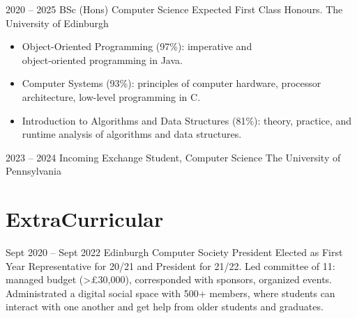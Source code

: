 \documentclass[
	9pt, %
]{FreemanCV}
\begin{document}
\begin{paracol}{2}
\qualificationentry
	{2020 -- 2025} %
	{BSc (Hons) Computer Science} %
	{Expected First Class Honours.} %
	{} %
	{The University of Edinburgh} %
	{
		\begin{itemize}[noitemsep, topsep=0pt, partopsep=0pt, leftmargin=8pt, before =\leavevmode\vspace*{-\baselineskip}]
			\item Object-Oriented Programming (97\%): imperative and \\object-oriented programming in Java.
			\item Computer Systems (93\%): principles of computer hardware, processor architecture, low-level programming in C. 
			\item Introduction to Algorithms and Data Structures (81\%): theory, practice, and runtime analysis of algorithms and data structures.
		\end{itemize}
	} %


\qualificationentry
	{2023 -- 2024} %
	{Incoming Exchange Student, Computer Science} %
	{} %
	{} %
	{The University of Pennsylvania} %
	{}


\section{ExtraCurricular}


\extracurricularentry
	{Sept 2020 -- Sept 2022}
	{Edinburgh Computer Society}
	{President}
	{
		Elected as First Year Representative for 20/21 and President for 21/22. 
		Led committee of 11: managed budget (>£30,000), corresponded with sponsors, organized events.
		Administrated a digital social space with 500+ members, where students can interact with one another and get help from older students and graduates. 
	}



\end{paracol}
\end{document}
